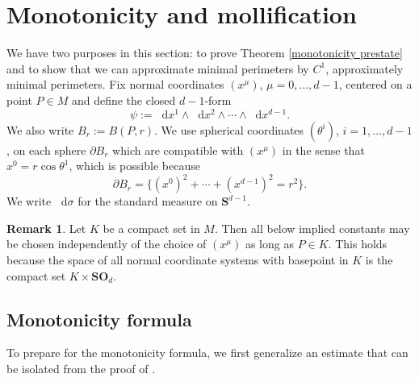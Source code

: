 \documentclass[reqno,10pt]{amsart}
\newcommand{\Sph}{\mathbf S}
\newcommand{\SpOrth}{\mathbf{SO}}
\newcommand*\dif{\mathop{}\!\mathrm{d}}
\theoremstyle{definition}
\newtheorem{remark}[theorem]{Remark}
\numberwithin{equation}{section}
\begin{document}
\section{Monotonicity and mollification}\label{MollifierSection}
We have two purposes in this section: to prove Theorem \ref{monotonicity prestate} and to show that we can approximate minimal perimeters by $C^1$, approximately minimal perimeters.
Fix normal coordinates $(x^\mu)$, $\mu = 0, \dots, d - 1$, centered on a point $P \in M$ and define the closed $d-1$-form
\begin{equation}\label{d1 form}
\psi := \dif x^1 \wedge \dif x^2 \wedge \cdots \wedge \dif x^{d - 1}.
\end{equation}
We also write $B_r := B(P, r)$.
We use spherical coordinates $(\theta^i)$, $i = 1, \dots, d - 1$, on each sphere $\partial B_r$ which are compatible with $(x^\mu)$ in the sense that $x^0 = r \cos \theta^1$, which is possible because
\begin{equation}\label{partial Br is a variety}
\partial B_r = \{(x^0)^2 + \cdots + (x^{d - 1})^2 = r^2\}.
\end{equation}
We write $\dif \sigma$ for the standard measure on $\Sph^{d - 1}$.

\begin{remark}\label{independence of constants}
Let $K$ be a compact set in $M$.
Then all below implied constants may be chosen independently of the choice of $(x^\mu)$ as long as $P \in K$.
This holds because the space of all normal coordinate systems with basepoint in $K$ is the compact set $K \times \SpOrth_d$.
\end{remark}

\subsection{Monotonicity formula}
To prepare for the monotonicity formula, we first generalize an estimate that can be isolated from the proof of \cite[Lemma 5.8]{Giusti77}.
\end{document}
